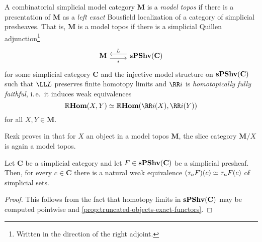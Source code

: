 \begin{definition}\label{defn:model-topos}
  A combinatorial simplicial model category \(\mathbf M\) is a
  \emph{model topos} if there is a presentation of \(\mathbf M\) as a
  \emph{left exact} Bousfield localization of a category of simplicial
  presheaves. That is, \(\mathbf M\) is a model topos if there is a
  simplicial Quillen adjunction\footnote{Written in the direction of
    the right adjoint.}
  \[
  \begin{tikzcd}
    \mathbf M \arrow[r, shift right=.7ex, "i"'] & \arrow[l, shift right=.7ex, "L"'] \spshv(\mathbf C)
  \end{tikzcd}
  \]
  for some simplicial category \(\mathbf C\) and the injective model
  structure on \(\operatorname{\textnormal{\bfseries sPShv}}(\mathbf C)\) such that \(\LL L\) preserves
  finite homotopy limits and \(\RR i\) is \emph{homotopically fully
    faithful}, i.\,e.~it induces weak equivalences
  \[
  \RHom(X, Y)\simeq\RHom(\RR i(X), \RR i(Y))
  \]
  for all \(X,Y\in\mathbf M\).
\end{definition}

Rezk proves in \cite[Corollary~6.10]{rezkhomotopytoposes} that for
\(X\) an object in a model topos \(\mathbf M\), the slice category
\(\mathbf M/X\) is again a model topos.

\begin{lemma}\label{lem:trunc-presheaves}
  Let \(\mathbf C\) be a simplicial category and let
  \(F\in\operatorname{\textnormal{\bfseries sPShv}}(\mathbf C)\) be a simplicial presheaf. Then, for every
  \(c\in\mathbf C\) there is a natural weak equivalence
  \((\tau_{n}F)(c)\simeq \tau_{n}F(c)\) of simplicial sets.
\end{lemma}
\begin{proof}
  This follows from the fact that homotopy limits in \(\operatorname{\textnormal{\bfseries sPShv}}(\mathbf
  C)\) may be computed pointwise and
  \autoref{prop:truncated-objects-exact-functors}.
\end{proof}

